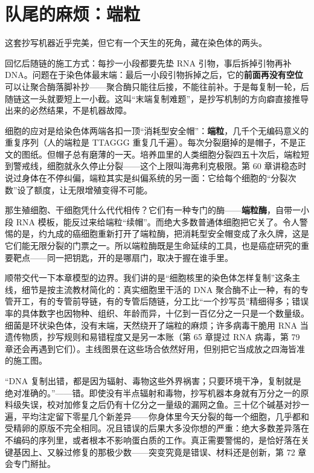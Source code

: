 \section{队尾的麻烦：端粒}

这套抄写机器近乎完美，但它有一个天生的死角，藏在染色体的两头。

回忆后随链的施工方式：每抄一小段都要先垫 RNA 引物，事后拆掉引物再补 DNA。问题在于染色体最末端：最后一小段引物拆掉之后，它的\textbf{前面再没有空位}可以让聚合酶落脚补抄——聚合酶只能往后接，不能往前补。于是每复制一轮，后随链这一头就要短上一小截。这叫“末端复制难题”，是抄写机制的方向癖直接推导出来的必然结果，不是机器故障。

细胞的应对是给染色体两端各扣一顶“消耗型安全帽”：\textbf{端粒}，几千个无编码意义的重复序列（人的端粒是 TTAGGG 重复几千遍）。每次分裂磨掉的是帽子，不是正文的图纸。但帽子总有磨薄的一天。培养皿里的人类细胞分裂四五十次后，端粒短到警戒线，细胞就永久停止分裂——这个上限叫海弗利克极限。第 60 章讲稳态时说过身体在不停纠偏，端粒其实是纠偏系统的另一面：它给每个细胞的“分裂次数”设了额度，让无限增殖变得不可能。

那生殖细胞、干细胞凭什么代代相传？它们有一种专门的酶——\textbf{端粒酶}，自带一小段 RNA 模板，能反过来给端粒“续帽”。而绝大多数普通体细胞把它关了。令人警惕的是，约九成的癌细胞重新打开了端粒酶，把消耗型安全帽变成了永久牌，这是它们能无限分裂的门票之一。所以端粒酶既是生命延续的工具，也是癌症研究的重要靶点——同一把钥匙，开的是哪扇门，取决于握在谁手里。

顺带交代一下本章模型的边界。我们讲的是“细胞核里的染色体怎样复制”这条主线，细节是按主流教材简化的：真实细胞里干活的 DNA 聚合酶不止一种，有的专管开工，有的专管前导链，有的专管后随链，分工比“一个抄写员”精细得多；错误率的具体数字也因物种、组织、年龄而异，十亿到一百亿分之一只是一个数量级。细菌是环状染色体，没有末端，天然绕开了端粒的麻烦；许多病毒干脆用 RNA 当遗传物质，抄写规则和易错程度又是另一本账（第 65 章提过 RNA 病毒，第 79 章还会再遇到它们）。主线图景在这些场合依然好用，但别把它当成放之四海皆准的施工图。

\begin{wuqu}
“DNA 复制出错，都是因为辐射、毒物这些外界祸害；只要环境干净，复制就是绝对准确的。”——错。即使没有半点辐射和毒物，抄写机器本身就有万分之一的原料级失误，校对加修复之后仍有十亿分之一量级的漏网之鱼。三十亿个碱基对抄一遍，平均注定留下零星几个新差异——你身体里今天分裂的每一个细胞，几乎都和受精卵的原版不完全相同。况且错误的后果大多没你想的严重：绝大多数差异落在不编码的序列里，或者根本不影响蛋白质的工作。真正需要警惕的，是恰好落在关键基因上、又躲过修复的那极少数——突变究竟是错误、材料还是创新，第 72 章会专门掰扯。
\end{wuqu}

